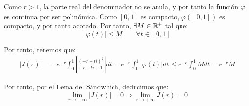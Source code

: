 \begin{ejercicio}
    Como $r>1$, la parte real del denominador no se anula, y por tanto la función $\varphi$ es continua por ser polinómica. Como $[0,1]$ es compacto, $\varphi\left(\left[0,1\right]\right)$ es compacto, y por tanto acotado. Por tanto, $\exists M\in \mathbb{R}^+$ tal que:
    \begin{equation*}
        \left|\varphi(t)\right| \leq M\qquad \forall t \in [0,1]
    \end{equation*}

    Por tanto, tenemos que:
    \begin{align*}
        |J(r)| &= e^{-r}\int_{0}^{1} \left|\frac{(-r+ti)^2}{-r+ti+1}\right|dt
        = e^{-r}\int_{0}^{1} \left|\varphi(t)\right|dt
        \leq e^{-r}\int_{0}^{1} M dt
        = e^{-r}M
    \end{align*}

    Por tanto, por el Lema del Sándwhich, deducimos que:
    \begin{equation*}
        \lim_{r\to+\infty} |J(r)| = 0
        \Longrightarrow \lim_{r\to+\infty} J(r) = 0
    \end{equation*}
\end{ejercicio}

